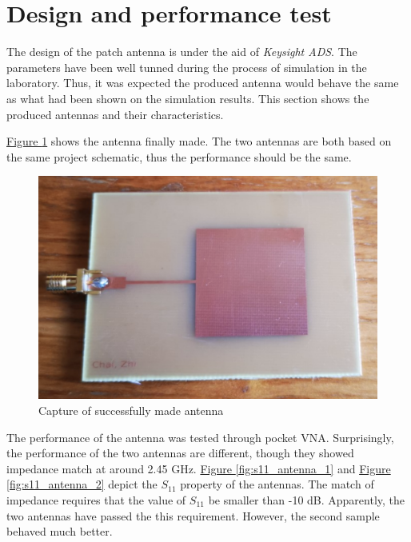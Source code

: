 \documentclass[12pt,a4paper]{report}
\begin{document}
\section{Design and performance test}
The design of the patch antenna is under the aid of \emph{Keysight ADS}. The parameters have been well tunned during the process of simulation in the laboratory. Thus, it was expected the produced antenna would behave the same as what had been shown on the simulation results.
This section shows the produced antennas and their characteristics.

\hyperref[fig:antenna_photo]{Figure \ref*{fig:antenna_photo}} shows the antenna finally made. The two antennas are both based on the same project schematic, thus the performance should be the same.

\begin{figure}[ht]
    \centerline{\includegraphics[scale=0.8]{antenna_photo}}
    \caption{Capture of successfully made antenna}
    \label{fig:antenna_photo}
\end{figure}

The performance of the antenna was tested through pocket VNA. Surprisingly, the performance of the two antennas are different, though they showed impedance match at around 2.45 GHz. \hyperref[fig:s11_antenna_1]{Figure \ref*{fig:s11_antenna_1}} and \hyperref[fig:s11_antenna_2]{Figure \ref*{fig:s11_antenna_2}} depict the $S_{11}$ property of the antennas. The match of impedance requires that the value of $S_{11}$ be smaller than -10 dB. Apparently, the two antennas have passed the this requirement. However, the second sample behaved much better.
\end{document}
